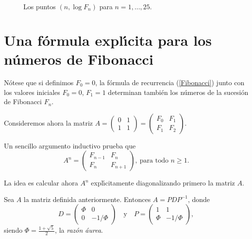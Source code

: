 \begin{figure}
\begin{center}
\end{center}
\caption{\label{grafica} Los puntos $(n,\log F_n)$ para $n=1,\dots,25$.}
\end{figure}



\section{Una f\'ormula expl\'\i cita para los n\'umeros de Fibonacci}

N\'otese que si definimos $F_0=0$, la f\'ormula de recurrencia (\ref{Fibonacci}) junto con los valores iniciales $F_0=0$, $F_1=1$ determinan tambi\'en los n\'umeros de la sucesi\'on de Fibonacci $F_n$.

Consideremos ahora la matriz $A=\begin{pmatrix} 0&1\\ 1&1\end{pmatrix}=\begin{pmatrix} F_0&F_1\\ F_1&F_2\end{pmatrix}$.

Un sencillo argumento inductivo prueba que
\begin{equation}\label{FormulaPotenciaN} A^n=\begin{pmatrix} F_{n-1}&F_n\\ F_n&F_{n+1}\end{pmatrix},\ \text{para todo } n\geq 1.\end{equation}

La idea es calcular ahora $A^n$ expl\'\i citamente diagonalizando primero la matriz $A$.

\begin{teorema} Sea $A$ la matriz definida anteriormente. Entonces $A=PDP^{-1}$, donde
$$D=\begin{pmatrix} \Phi&0\\ 0&-1/\Phi\end{pmatrix}\quad \text{y}\quad P=\begin{pmatrix} 1&1\\ \Phi &-1/\Phi\end{pmatrix},$$
siendo $\displaystyle \Phi=\frac{1+\sqrt 5}{2}$, la \emph{raz\'on \'aurea}.
\end{teorema}


